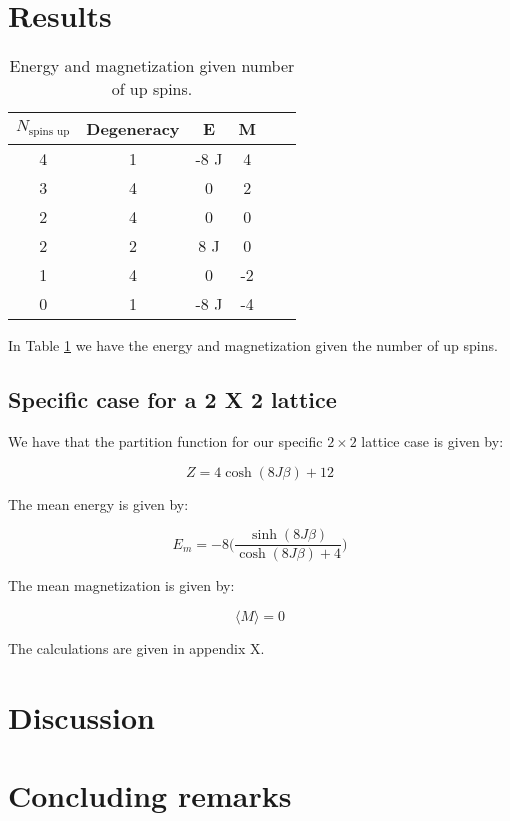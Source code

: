 \documentclass{article}
\begin{document}
\begin{multicols}{2}
\section{Results}

\begin{table}[H]
\begin{center}
\caption{Energy and magnetization given number of up spins.}
\begin{tabular}{  |c|c|c|c|c|c| } \hline
$N_{\text{spins up}}$&Degeneracy&E&M \\ \hline
4&1&-8 J&4\\ \hline
3&4&0 &2 \\ \hline
2&4&0&0\\ \hline
2&2&8 J&0\\ \hline
1&4&0&-2\\ \hline
0&1&-8 J&-4\\ \hline
\end{tabular}
\label{tab:up_spins}
\end{center}
\end{table}

In Table \ref{tab:up_spins} we have the energy and magnetization given the number of up spins. 

\subsection*{Specific case for a 2 X 2 lattice}

We have that the partition function for our specific $2\times2$ lattice case is given by:

\begin{equation}
Z=4\cosh{(8J\beta)}+12
\label{eq:Z_22}
\end{equation}

The mean energy is given by:

\begin{equation}
E_m=-8\bigg(\frac{\sinh{(8J\beta)}}{\cosh{(8J\beta)}+4}\bigg)
\label{eq:E_22}
\end{equation}

The mean magnetization is given by:

\begin{equation}
\langle M \rangle=0
\label{eq:M_22}
\end{equation}

The calculations are given in appendix X.

\section{Discussion}

\section{Concluding remarks}

\end{multicols}
\end{document}
